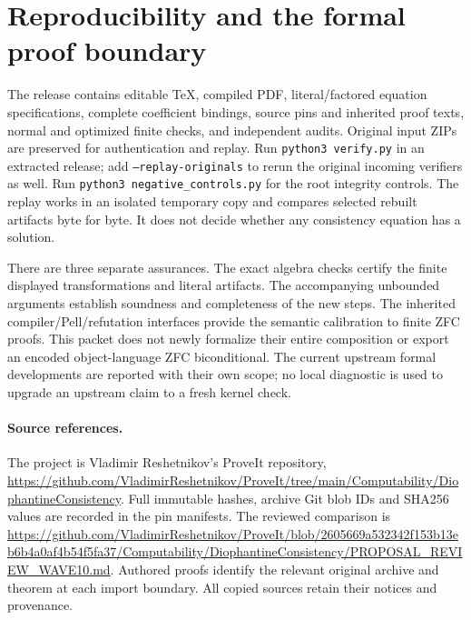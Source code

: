 \documentclass[11pt]{article}
\begin{document}
\section{Reproducibility and the formal proof boundary}
The release contains editable TeX, compiled PDF, literal/factored equation
specifications, complete coefficient bindings, source pins and inherited
proof texts, normal and optimized finite checks, and independent audits.
Original input ZIPs are preserved for authentication and replay.
Run \texttt{python3 verify.py} in an extracted release; add
\texttt{--replay-originals} to rerun the original incoming verifiers as well.
Run \texttt{python3 negative\_controls.py} for the root integrity controls.
The replay works in an isolated temporary copy and compares selected rebuilt
artifacts byte for byte. It does not decide whether any consistency equation
has a solution.

There are three separate assurances. The exact algebra checks certify the
finite displayed transformations and literal artifacts. The accompanying
unbounded arguments establish soundness and completeness of the new steps.
The inherited compiler/Pell/refutation interfaces provide the semantic
calibration to finite ZFC proofs. This packet does not newly formalize their
entire composition or export an encoded object-language ZFC biconditional.
The current upstream formal developments are reported with their own scope;
no local diagnostic is used to upgrade an upstream claim to a fresh kernel
check.

\paragraph{Source references.}
The project is Vladimir Reshetnikov's ProveIt repository,
\url{https://github.com/VladimirReshetnikov/ProveIt/tree/main/Computability/DiophantineConsistency}.
Full immutable hashes, archive Git blob IDs and SHA256 values are recorded
in the pin manifests. The reviewed comparison is
\url{https://github.com/VladimirReshetnikov/ProveIt/blob/2605669a532342f153b13eb6b4a0af4b54f5fa37/Computability/DiophantineConsistency/PROPOSAL_REVIEW_WAVE10.md}.
Authored proofs identify the relevant original archive and theorem at each
import boundary. All copied sources retain their notices and provenance.
\end{document}

